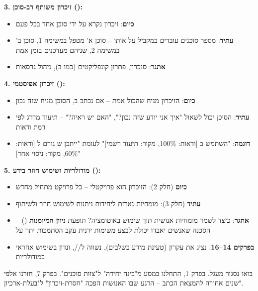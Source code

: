 \textbf{\num{3}. זיכרון משותף רב-סוכן ():}
\begin{itemize}
  \item \textbf{כיום}: זיכרון נקרא על ידי סוכן אחד בכל פעם
  \item \textbf{עתיד}: מספר סוכנים עובדים במקביל על אותו  – סוכן א' מטפל במשימה \num{1}, סוכן ב' במשימה \num{2}, שניהם מעדכנים בזמן אמת
  \item \textbf{אתגר}: סנכרון, פתרון קונפליקטים (כמו ב), ניהול גרסאות
\end{itemize}

\textbf{\num{4}. זיכרון אפיסטמי ():}
\begin{itemize}
  \item \textbf{כיום}: הזיכרון מניח שהכול אמת – אם נכתב ב, הסוכן מניח שזה נכון
  \item \textbf{עתיד}: הסוכן יכול לשאול "איך אני יודע שזה נכון?", "האם יש ראיה?" – תיעוד מדרג לפי רמת ודאות
  \item \textbf{דוגמה}: "השתמש ב [ודאות: \num{100}\%, מקור: תיעוד רשמי]" לעומת "ייתכן ש גורם ל [ודאות: \num{60}\%, מקור: ניסוי אחד]"
\end{itemize}

\textbf{\num{5}. מודולריות ושימוש חוזר בידע ():}
\begin{itemize}
  \item \textbf{כיום} (חלק \num{2}): הזיכרון הוא פרויקטלי – כל פרויקט מתחיל מחדש
  \item \textbf{עתיד} (חלק \num{3}): מומחיות נארזת ליחידות \textbf{} ניתנות לשימוש חוזר ולשיתוף
  \item \textbf{אתגר}: כיצד לשמר מומחיות אנושית תוך שימוש באוטומציה? תופעת \textbf{ניוון המיומנות} () – הסכנה שאנשים יאבדו יכולת לבצע משימות ידנית עקב הסתמכות יתר על 
  \item \textbf{בפרקים \num{14}–\num{16}}: נציג את עקרון  (טעינת מידע בשלבים), נשווה  ל//, ונדון בשימוש אחראי במודולריות
\end{itemize}


בואו נסגור מעגל. בפרק \num{1}, התחלנו במסע מ"בינה יחידה" ל"צוות סוכנים". בפרק \num{7}, חזרנו אלפי שנים אחורה להמצאת הכתב – הרגע שבו האנושות הפכה "חסרת-זיכרון" ל"בעלת-ארכיון".

